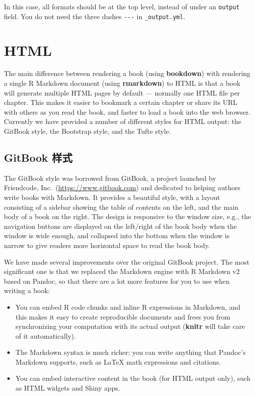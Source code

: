 \documentclass[
  12pt,
]{krantz}
\providecommand{\tightlist}{%
  \setlength{\itemsep}{0pt}\setlength{\parskip}{0pt}}
\theoremstyle{definition}
\theoremstyle{definition}
\theoremstyle{definition}
\theoremstyle{definition}
\theoremstyle{remark}
\begin{document}
In this case, all formats should be at the top level, instead of under an \texttt{output} field. You do not need the three dashes \texttt{-\/-\/-} in \texttt{\_output.yml}.

\hypertarget{html}{%
\section{HTML}\label{html}}

The main difference between rendering a book (using \textbf{bookdown}) with rendering a single R Markdown document (using \textbf{rmarkdown}) to HTML is that a book will generate multiple HTML pages by default --- normally one HTML file per chapter. This makes it easier to bookmark a certain chapter or share its URL with others as you read the book, and faster to load a book into the web browser. Currently we have provided a number of different styles for HTML output: the GitBook style, the Bootstrap style, and the Tufte style.

\hypertarget{gitbook-style}{%
\subsection{GitBook 样式}\label{gitbook-style}}

The GitBook style was borrowed from GitBook, a project launched by Friendcode, Inc.~(\url{https://www.gitbook.com}) and dedicated to helping authors write books with Markdown. It provides a beautiful style, with a layout consisting of a sidebar showing the table of contents on the left, and the main body of a book on the right. The design is responsive to the window size, e.g., the navigation buttons are displayed on the left/right of the book body when the window is wide enough, and collapsed into the bottom when the window is narrow to give readers more horizontal space to read the book body.

We have made several improvements over the original GitBook project. The most significant one is that we replaced the Markdown engine with R Markdown v2 based on Pandoc, so that there are a lot more features for you to use when writing a book:

\begin{itemize}
\tightlist
\item
  You can embed R code chunks and inline R expressions in Markdown, and this makes it easy to create reproducible documents and frees you from synchronizing your computation with its actual output (\textbf{knitr} will take care of it automatically).
\item
  The Markdown syntax is much richer: you can write anything that Pandoc's Markdown supports, such as LaTeX math expressions and citations.
\item
  You can embed interactive content in the book (for HTML output only), such as HTML widgets and Shiny apps.
\end{itemize}
\end{document}
